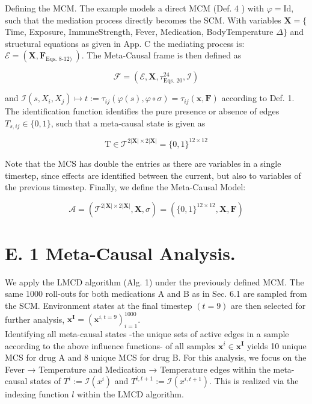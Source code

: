 \documentclass[10pt]{article}
\begin{document}
Defining the MCM. The example models a direct MCM (Def. 4 ) with $\varphi=\mathrm{Id}$, such that the mediation process directly becomes the SCM. With variables $\mathbf{X}=\{$ Time, Exposure, ImmuneStrength, Fever, Medication, BodyTemperature $\Delta\}$ and structural equations as given in App. C the mediating process is: $\mathcal{E}=\left(\mathbf{X}, \mathbf{F}_{\text {Eqs. 8-12) }}\right)$. The Meta-Causal frame is then defined as


\begin{equation*}
\mathcal{F}=\left(\mathcal{E}, \mathbf{X}, \tau_{\text {Eqs. } 20}^{24}, \mathcal{I}\right) \tag{25}
\end{equation*}


and $\mathcal{I}\left(s, X_{i}, X_{j}\right) \mapsto t:=\tau_{i j}(\varphi(s), \varphi \circ \sigma)=\tau_{i j}(\mathbf{x}, \mathbf{F})$ according to Def. 1. The identification function identifies the pure presence or absence of edges $T_{s, i j} \in\{0,1\}$, such that a meta-causal state is given as


\begin{equation*}
\mathrm{T} \in \mathcal{T}^{2|\mathbf{X}| \times 2|\mathbf{X}|}=\{0,1\}^{12 \times 12} \tag{26}
\end{equation*}


Note that the MCS has double the entries as there are variables in a single timestep, since effects are identified between the current, but also to variables of the previous timestep. Finally, we define the Meta-Causal Model:


\begin{equation*}
\mathcal{A}=\left(\mathcal{T}^{2|\mathbf{X}| \times 2|\mathbf{X}|}, \mathbf{X}, \sigma\right)=\left(\{0,1\}^{12 \times 12}, \mathbf{X}, \mathbf{F}\right) \tag{27}
\end{equation*}


\section*{E. 1 Meta-Causal Analysis.}
We apply the LMCD algorithm (Alg. 1) under the previously defined MCM. The same 1000 roll-outs for both medications A and B as in Sec. 6.1 are sampled from the SCM. Environment states at the final timestep $(t=9)$ are then selected for further analysis, $\mathbf{x}^{\mathbf{I}}=\left(\mathbf{x}^{i, t=9}\right)_{i=1}^{1000}$.\\
Identifying all meta-causal states -the unique sets of active edges in a sample according to the above influence functions- of all samples $\mathbf{x}^{i} \in \mathbf{x}^{\mathbf{I}}$ yields 10 unique MCS for drug A and 8 unique MCS for drug B. For this analysis, we focus on the Fever → Temperature and Medication → Temperature edges within the meta-causal states of $T^{i}:=\mathcal{I}\left(x^{i}\right)$ and $T^{i, t+1}:=\mathcal{I}\left(x^{i, t+1}\right)$. This is realized via the indexing function $l$ within the LMCD algorithm.
\end{document}
